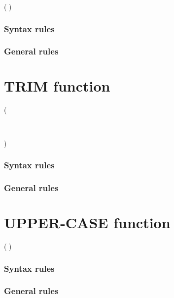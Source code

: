 \begin{syntax}
    ( \argument )
\end{syntax}

\subsubsection{Syntax rules}

\subsubsection{General rules}

\section{TRIM function}

\begin{syntax}
    ( \argument
  \begin{0-1}
     \\
  \end{0-1}
  )
\end{syntax}

\subsubsection{Syntax rules}

\subsubsection{General rules}

\section{UPPER-CASE function}

\begin{syntax}
    ( \argument )
\end{syntax}

\subsubsection{Syntax rules}

\subsubsection{General rules}

